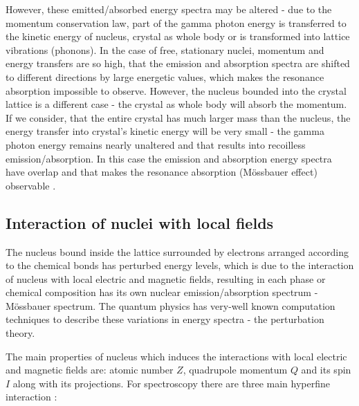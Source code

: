 \par
However, these emitted/absorbed energy spectra may be altered - due to the  momentum conservation law, part of the gamma photon energy is transferred to the  kinetic energy of nucleus, crystal as whole body or is transformed into lattice vibrations (phonons). 
In the case of free, stationary nuclei, momentum and energy transfers are so high, that the emission and absorption spectra are shifted to different directions by large energetic values, which makes the resonance absorption impossible to observe. However, the nucleus bounded into the crystal lattice is a different case - the crystal as whole body will absorb the momentum. If we consider, that the entire crystal has much larger mass than the nucleus, the energy transfer into crystal's kinetic energy will be very small - the gamma photon energy remains nearly unaltered and that results into recoilless emission/absorption. In this case the  emission and absorption energy spectra have overlap and that makes the resonance absorption (Mössbauer effect) observable \cite{moss}.

\subsection{Interaction of nuclei with local fields}

The nucleus bound inside the lattice surrounded by electrons arranged according to the chemical bonds has perturbed energy levels, which is due to the interaction of nucleus with local electric and magnetic fields, resulting in each phase or chemical composition has its own nuclear emission/absorption spectrum - Mössbauer spectrum. The quantum physics has very-well known computation techniques to describe these variations in energy spectra - the perturbation theory.

\par
The main properties of nucleus which induces the interactions with local electric and magnetic fields are: atomic number $Z$, quadrupole momentum $Q$ and its spin $I$ along with its projections. For spectroscopy there are three main hyperfine interaction \cite{moss}:

